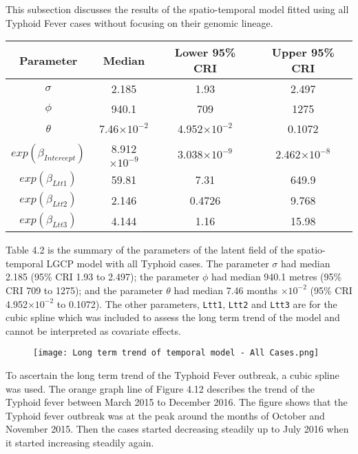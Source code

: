 \documentclass[a4paper]{thesis}
\begin{document}
This subsection discusses the results of the spatio-temporal model fitted using all Typhoid Fever cases without focusing on their genomic lineage.

\begin{table}[h]
    \centering
    \begin{tabular}{cccc}
    \toprule
         Parameter & Median & Lower 95\%  CRI & Upper 95\%  CRI\\ \midrule
        $\sigma$ & 2.185 & 1.93 & 2.497 \\
        $\phi$ & 940.1 & 709 & 1275 \\
        $\theta$ & 7.46$\times10^{-2}$ & 4.952$\times10^{-2}$ & 0.1072 \\
        $exp(\beta_{Intercept})$ & 8.912$\times10^{-9}$ & 3.038$\times10^{-9}$ & 2.462$\times10^{-8}$ \\
        $exp(\beta_{Ltt1})$ & 59.81 & 7.31 & 649.9 \\
        $exp(\beta_{Ltt2})$ & 2.146 & 0.4726 & 9.768 \\
        $exp(\beta_{Ltt3})$ & 4.144 & 1.16 & 15.98 \\
        \bottomrule
    \end{tabular}
\end{table}

Table 4.2 is the summary of the parameters of the latent field of the spatio-temporal LGCP model with all Typhoid cases. The parameter $\sigma$ had median 2.185 (95\% CRI 1.93 to 2.497); the parameter $\phi$ had median 940.1 metres (95\% CRI 709 to 1275); and the parameter $\theta$ had median 7.46 months $\times10^{-2}$ (95\% CRI 4.952$\times10^{-2}$ to 0.1072). The other parameters, \verb=Ltt1=, \verb=Ltt2= and \verb=Ltt3= are for the cubic spline which was included to assess the long term trend of the model and cannot be interpreted as covariate effects.

\begin{figure}[H]
\begin{center}
\texttt{[image: Long term trend of temporal model - All Cases.png]}
\end{center}
\end{figure}

To ascertain the long term trend of the Typhoid Fever outbreak, a cubic spline was used. The orange graph line of Figure 4.12 describes the trend of the Typhoid fever between March 2015 to December 2016. The figure shows that the Typhoid fever outbreak was at the peak around the months of October and November 2015. Then the cases started decreasing steadily up to July 2016 when it started increasing steadily again. 
\end{document}
